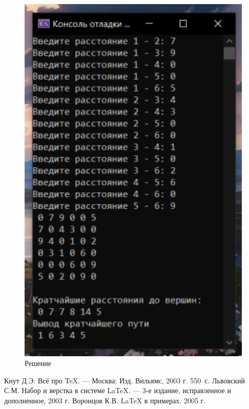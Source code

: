 \documentclass[12pt,a4paper]{scrartcl}
\begin{document}
\label{sec:picexample}
\begin{figure}[h]
	\begin{center}
    \begin{minipage}{0.39\linewidth}
	  \includegraphics[width=1\textwidth]{Решение.PNG}
	  \caption{Решение}\label{fig:par}
    \end{minipage}
    \end{center}
\end{figure}



\begin{thebibliography}{9}
Кнут Д.Э. Всё про \TeX. \newblock --- Москва: Изд. Вильямс, 2003 г. 550~с.
Львовский С.М. Набор и верстка в системе \LaTeX{}. \newblock --- 3-е издание, исправленное и дополненное, 2003 г.
Воронцов К.В. \LaTeX{} в примерах. 2005 г.
\end{thebibliography}
\end{document}
